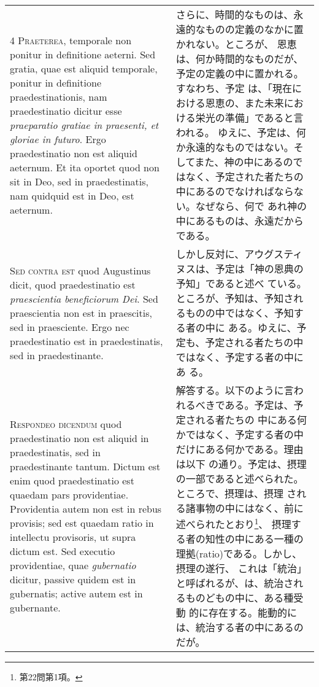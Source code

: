 \documentclass[10pt]{jsarticle} %
\begin{document}
\begin{longtable}{p{21em}p{21em}}
\\


{\scshape  4 Praeterea}, temporale non ponitur in
definitione aeterni. Sed gratia, quae est aliquid temporale, ponitur in
definitione praedestinationis, nam praedestinatio dicitur esse
{\itshape praeparatio gratiae in praesenti, et gloriae in futuro}. Ergo
praedestinatio non est aliquid aeternum. Et ita oportet quod non sit in
Deo, sed in praedestinatis, nam quidquid est in Deo, est aeternum.


&


さらに、時間的なものは、永遠的なものの定義のなかに置かれない。ところが、
恩恵は、何か時間的なものだが、予定の定義の中に置かれる。すなわち、予定
は、「現在における恩恵の、また未来における栄光の準備」であると言われる。
ゆえに、予定は、何か永遠的なものではない。そしてまた、神の中にあるので
はなく、予定された者たちの中にあるのでなければならない。なぜなら、何で
あれ神の中にあるものは、永遠だからである。

 

\\


{\scshape  Sed contra est} quod Augustinus dicit, quod
praedestinatio est {\itshape praescientia beneficiorum Dei}. Sed praescientia non
est in praescitis, sed in praesciente. Ergo nec praedestinatio est in
praedestinatis, sed in praedestinante.


&

しかし反対に、アウグスティヌスは、予定は「神の恩典の予知」であると述べ
ている。ところが、予知は、予知されるものの中ではなく、予知する者の中に
ある。ゆえに、予定も、予定される者たちの中ではなく、予定する者の中にあ
る。
 

\\


{\scshape Respondeo dicendum} quod praedestinatio non est
aliquid in praedestinatis, sed in praedestinante tantum. Dictum est enim
quod praedestinatio est quaedam pars providentiae. Providentia autem non
est in rebus provisis; sed est quaedam ratio in intellectu provisoris,
ut supra dictum est. Sed executio providentiae, quae {\itshape gubernatio} dicitur,
 passive quidem est in gubernatis; active autem est in gubernante.


 &

 解答する。以下のように言われるべきである。予定は、予定される者たちの
 中にある何かではなく、予定する者の中だけにある何かである。理由は以下
 の通り。予定は、摂理の一部であると述べられた。ところで、摂理は、摂理
 される諸事物の中にはなく、前に述べられたとおり\footnote{第22問第1項。}、
 摂理する者の知性の中にある一種の理拠(ratio)である。しかし、摂理の遂行、
 これは「統治」と呼ばれるが、は、統治されるものどもの中に、ある種受動
 的に存在する。能動的には、統治する者の中にあるのだが。


\end{longtable}
\end{document}
